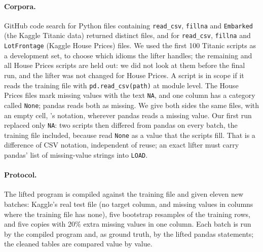 \paragraph{Corpora.} GitHub code search for Python files containing \texttt{read\_csv},
\texttt{fillna} and \texttt{Embarked} (the Kaggle Titanic data) returned \CorpusAll{} distinct files,
and for \texttt{read\_csv}, \texttt{fillna} and \texttt{LotFrontage} (Kaggle House Prices) \HousesAll{}
files. We used the first 100 Titanic scripts as a development set, to choose which idioms the lifter
handles; the remaining \CorpusTest{} and all House Prices scripts are held out: we did not look at them
before the final run, and the lifter was not changed for House Prices. A script is in scope if it reads
the training file with \texttt{pd.read\_csv(path)} at module level. The House Prices files mark missing
values with the text \texttt{NA}, and one column has a category called \texttt{None}; pandas reads both
as missing. We give both sides the same files, with an empty cell, \PL's notation, wherever pandas reads
a missing value. Our first run replaced only \texttt{NA}: two scripts then differed from pandas on every
batch, the training file included, because \PL read \texttt{None} as a value that the scripts fill.
That is a difference of CSV notation, independent of reuse; an exact lifter must carry pandas' list of
missing-value strings into \texttt{LOAD}.

\paragraph{Protocol.} The lifted program is compiled against the training file and given eleven new
batches: Kaggle's real test file (no target column, and missing values in columns where the training
file has none), five bootstrap resamples of the training rows, and five copies with 20\% extra missing
values in one column. Each batch is run by the compiled program and, as ground truth, by the lifted
pandas statements; the cleaned tables are compared value by value.



